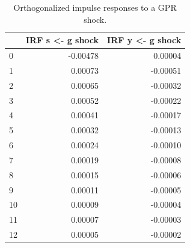 \begin{table}[H]
\centering
\caption{Orthogonalized impulse responses to a GPR shock.}
\label{tab:irf_focus}
\begin{tabular}{lrr}
\toprule
 & IRF s <- g shock & IRF y <- g shock \\
\midrule
0 & -0.00478 & 0.00004 \\
1 & 0.00073 & -0.00051 \\
2 & 0.00065 & -0.00032 \\
3 & 0.00052 & -0.00022 \\
4 & 0.00041 & -0.00017 \\
5 & 0.00032 & -0.00013 \\
6 & 0.00024 & -0.00010 \\
7 & 0.00019 & -0.00008 \\
8 & 0.00015 & -0.00006 \\
9 & 0.00011 & -0.00005 \\
10 & 0.00009 & -0.00004 \\
11 & 0.00007 & -0.00003 \\
12 & 0.00005 & -0.00002 \\
\bottomrule
\end{tabular}
\end{table}